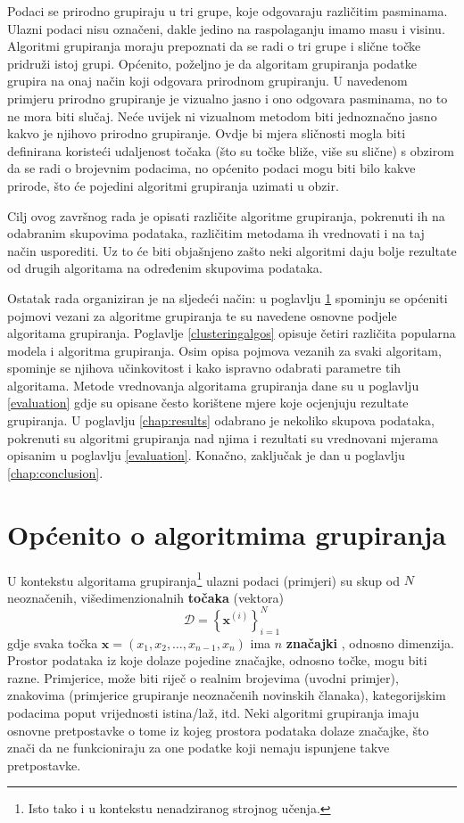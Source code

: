 \documentclass[times, utf8, zavrsni]{fer}
\begin{document}
Podaci se prirodno grupiraju u tri grupe, koje odgovaraju različitim pasminama. Ulazni podaci nisu označeni, dakle jedino na raspolaganju imamo masu i visinu. Algoritmi grupiranja moraju prepoznati da se radi o tri grupe i slične točke pridruži istoj grupi. Općenito, poželjno je da algoritam grupiranja podatke grupira na onaj način koji odgovara prirodnom grupiranju. U navedenom primjeru prirodno grupiranje je vizualno jasno i ono odgovara pasminama, no to ne mora biti slučaj. Neće uvijek ni vizualnom metodom biti jednoznačno jasno kakvo je njihovo prirodno grupiranje. Ovdje bi mjera sličnosti mogla biti definirana koristeći udaljenost točaka (što su točke bliže, više su slične) s obzirom da se radi o brojevnim podacima, no općenito podaci mogu biti bilo kakve prirode, što će pojedini algoritmi grupiranja uzimati u obzir.

Cilj ovog završnog rada je opisati različite algoritme grupiranja, pokrenuti ih na odabranim skupovima podataka, različitim metodama ih vrednovati i na taj način usporediti. Uz to će biti objašnjeno zašto neki algoritmi daju bolje rezultate od drugih algoritama na određenim skupovima podataka.

Ostatak rada organiziran je na sljedeći način: u poglavlju \ref{clusteringgeneral} spominju se općeniti pojmovi vezani za algoritme grupiranja te su navedene osnovne podjele algoritama grupiranja. Poglavlje \ref{clusteringalgos} opisuje četiri različita popularna modela i algoritma grupiranja. Osim opisa pojmova vezanih za svaki algoritam, spominje se njihova učinkovitost i kako ispravno odabrati parametre tih algoritama. Metode vrednovanja algoritama grupiranja dane su u poglavlju \ref{evaluation} gdje su opisane često korištene mjere koje ocjenjuju rezultate grupiranja. U poglavlju \ref{chap:results} odabrano je nekoliko skupova podataka, pokrenuti su algoritmi grupiranja nad njima i rezultati su vrednovani mjerama opisanim u poglavlju \ref{evaluation}. Konačno, zaključak je dan u poglavlju \ref{chap:conclusion}.

\chapter{Općenito o algoritmima grupiranja}
\label{clusteringgeneral}
U kontekstu algoritama grupiranja\footnote{Isto tako i u kontekstu nenadziranog strojnog učenja.} ulazni podaci (primjeri) su skup od $N$ neoznačenih, višedimenzionalnih \textbf{točaka} (vektora) \[\mathcal{D} = \left\{ \mathbf{x}^{(i)} \right\}_{i=1}^{N} \]
gdje svaka točka $\mathbf{x} = \left(x_1, x_2, \dots, x_{n-1}, x_n\right)$ ima $n$ \textbf{značajki} , odnosno dimenzija. Prostor podataka iz koje dolaze pojedine značajke, odnosno točke, mogu biti razne. Primjerice, može biti riječ o realnim brojevima (uvodni primjer), znakovima (primjerice grupiranje neoznačenih novinskih članaka), kategorijskim podacima poput vrijednosti istina/laž, itd. Neki algoritmi grupiranja imaju osnovne pretpostavke o tome iz kojeg prostora podataka dolaze značajke, što znači da ne funkcioniraju za one podatke koji nemaju ispunjene takve pretpostavke.
\end{document}
